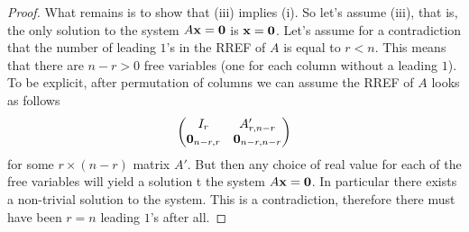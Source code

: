 \documentclass[10pt, a4paper]{article}
\begin{document}
\begin{lemma}
\begin{proof}
        What remains is to show that (iii) implies (i).
        So let's assume (iii), that is,
        the only solution to the system $A\mathbf{x} = \mathbf{0}$ is $\mathbf{x} = \mathbf{0}$.
        Let's assume for a contradiction that the number of leading $1$'s in the RREF of $A$ is equal to $r < n$.
        This means that there are $n - r > 0$ free variables (one for each column without a leading $1$).
        To be explicit, after permutation of columns we can assume the RREF of $A$ looks as follows
        \[
        \begin{pmatrix}
            I_r & A'_{r, n - r} \\
            \mathbf{0}_{n - r, r} & \mathbf{0}_{n - r, n - r}
        \end{pmatrix}
        \]
        for some $r \times (n - r)$ matrix $A'$.
        But then any choice of real value for each of the free variables will yield a solution t the system $A\mathbf{x} = \mathbf{0}$.
        In particular there exists a non-trivial solution to the system.
        This is a contradiction, therefore there must have been $r = n$ leading $1$'s after all.
    \end{proof}
\end{lemma}
\end{document}
